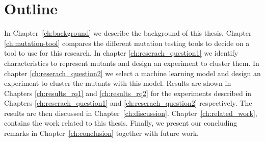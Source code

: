 \documentclass[../main]{subfiles}
\begin{document}
\section{Outline}
In Chapter~\ref{ch:background} we describe the background of this thesis. 
Chapter \ref{ch:mutation-tool} compares the different mutation testing tools to decide on a tool to use for this research.
In chapter \ref{ch:reserach_question1} we identify characteristics to represent mutants and design an experiment to cluster them.
In chapter \ref{ch:reserach_question2} we select a machine learning model and design an experiment to cluster the mutants with this model.
Results are shown in Chapters \ref{ch:results_rq1} and \ref{ch:results_rq2} for the experiments described in Chapters \ref{ch:reserach_question1} and \ref{ch:reserach_question2} respectively. 
The results are then discussed in Chapter~\ref{ch:discussion}.
\newline
Chapter~\ref{ch:related_work}, contains the work related to this thesis.
Finally, we present our concluding remarks in Chapter~\ref{ch:conclusion} together with future work.
\end{document}
